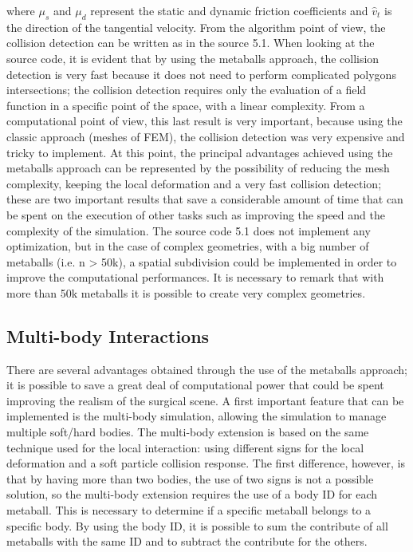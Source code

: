 \documentclass[journal]{vgtc}                %
\begin{document}
where $\mu _{s}$ and $\mu _{d}$ represent the static and dynamic friction coefficients and $\hat{v}_{t}$ is the direction of the tangential velocity. From the algorithm point of view, the collision detection can
be written as in the source 5.1. When looking at the source code, it is evident that by
using the metaballs approach, the collision detection is very fast because it does not
need to perform complicated polygons intersections; the collision detection requires
only the evaluation of a field function in a specific point of the space, with a linear
complexity. From a computational point of view, this last result is very important,
because using the classic approach (meshes of FEM), the collision detection was
very expensive and tricky to implement. At this point, the principal advantages
achieved using the metaballs approach can be represented by the possibility of
reducing the mesh complexity, keeping the local deformation and a very fast
collision detection; these are two important results that save a considerable amount
of time that can be spent on the execution of other tasks such as improving the speed
and the complexity of the simulation. The source code 5.1 does not implement any
optimization, but in the case of complex geometries, with a big number of metaballs
(i.e. n > 50k), a spatial subdivision could be implemented in order to improve the
computational performances. It is necessary to remark that with more than 50k
metaballs it is possible to create very complex geometries.

\subsection{Multi-body Interactions}
There are several advantages obtained through the use of the metaballs approach; it is
possible to save a great deal of computational power that could be spent improving
the realism of the surgical scene. A first important feature that can be implemented is
the multi-body simulation, allowing the simulation to manage multiple soft/hard
bodies. The multi-body extension is based on the same technique used for the local
interaction: using different signs for the local deformation and a soft particle
collision response. The first difference, however, is that by having more than two
bodies, the use of two signs is not a possible solution, so the multi-body extension
requires the use of a body ID for each metaball. This is necessary to determine if a
specific metaball belongs to a specific body. By using the body ID, it is possible to
sum the contribute of all metaballs with the same ID and to subtract the contribute
for the others.
\end{document}
